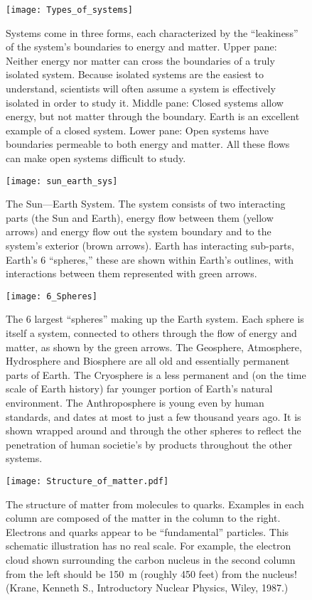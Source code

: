 \documentclass[amstex,12pt]{book}
\begin{document}
\begin{figure}[p]
\centering
\texttt{[image: Types\_of\_systems]}%
\caption{Systems come in three forms, each characterized by the ``leakiness'' of the system's boundaries to energy and matter. Upper pane: Neither energy nor matter can cross the boundaries of a truly isolated system. Because isolated systems are the easiest to understand, scientists will often assume a system is effectively isolated in order to study it. Middle pane: Closed systems allow energy, but not matter through the boundary. Earth is an excellent example of a closed system. Lower pane: Open systems have boundaries permeable to both energy and matter. All these flows can make open systems difficult to study.}
\label{fig:sys_types}
\end{figure}

\begin{figure}[p]
\centering
\texttt{[image: sun\_earth\_sys]}%
\caption{The Sun---Earth System. The system consists of two interacting parts (the Sun and Earth), energy flow between them (yellow arrows) and energy flow out the system boundary and to the system's exterior (brown arrows). Earth has interacting sub-parts, Earth's 6 ``spheres,'' these are shown within Earth's outlines, with interactions between them represented with green arrows.}
\label{fig:sun_earth_sys}
\end{figure}

\begin{figure}[p]
\centering
\texttt{[image: 6\_Spheres]}%
\caption{The 6 largest ``spheres'' making up the Earth system. Each sphere is itself a system, connected to others through the flow of energy and matter, as shown by the green arrows. The Geosphere, Atmosphere, Hydrosphere and Biosphere are all old and essentially permanent parts of Earth. The Cryosphere is a less  permanent and (on the time scale of Earth  history) far younger portion of Earth's natural environment. The Anthroposphere is young even by human standards, and dates at most to just a few thousand years ago. It is shown wrapped around and through the other spheres to reflect the penetration of human societie's by products throughout the other systems.}
\label{fig:6_spheres}
\end{figure} 

\begin{figure}[p]
\centering
\texttt{[image: Structure\_of\_matter.pdf]}%
\caption{The structure of matter from molecules to quarks. Examples in each column are composed of the matter in the column to the right. Electrons and quarks appear to be “fundamental” particles. This schematic illustration has no real scale. For example, the electron cloud shown surrounding the carbon nucleus in the second column from the left should be \SI{150}{m} (roughly 450 feet) from the nucleus! (Krane, Kenneth S., Introductory Nuclear Physics, Wiley, 1987.) }
\label{fig:matter_struct}
\end{figure}
\end{document}
